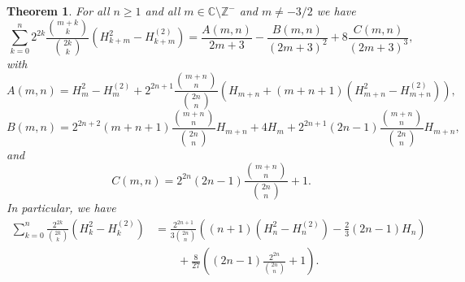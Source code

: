 \documentclass[11pt,reqno]{amsart}
\theoremstyle{plain}
\numberwithin{equation}{section}
\newtheorem{theorem}[thm]{Theorem}
\begin{document}
\begin{theorem}
For all $n\geq 1$ and all $m\in\mathbb C\setminus\mathbb Z^{-}$ and $m\neq -3/2$ we have
\begin{equation}\label{eq_har_final}
\sum_{k=0}^n 2^{2k} \frac{\binom{m+k}{k}}{\binom{2k}{k}}\left ( H_{k+m}^2 - H_{k+m}^{(2)}\right ) 
= \frac{A(m,n)}{2m+3} - \frac{B(m,n)}{(2m+3)^2} + 8 \frac{C(m,n)}{(2m+3)^3},
\end{equation}
with
\begin{equation}
A(m,n) = H_m^2-H_m^{(2)} + 2^{2n+1} \frac{\binom{m+n}{n}}{\binom{2n}{n}} \left ( H_{m+n}+(m+n+1)\left (H_{m+n}^2-H_{m+n}^{(2)}\right )\right ),
\end{equation}
\begin{equation}
B(m,n) = 2^{2n+2} (m+n+1) \frac{\binom{m+n}{n}}{\binom{2n}{n}}H_{m+n} + 4H_m + 2^{2n+1}(2n-1) \frac{\binom{m+n}{n}}{\binom{2n}{n}} H_{m+n},
\end{equation}
and
\begin{equation}
C(m,n) = 2^{2n} (2n-1) \frac{\binom{m+n}{n}}{\binom{2n}{n}} + 1.
\end{equation}
In particular, we have
\begin{align}\label{eq_har_final}
\sum_{k=0}^n \frac{2^{2k}}{\binom{2k}{k}}\left ( H_{k}^2 - H_{k}^{(2)}\right ) 
&= \frac{2^{2n+1}}{3 \binom{2n}{n}}\left ((n+1)\left( H_{n}^2 - H_{n}^{(2)}\right ) -  \frac{2}{3} (2n-1) H_n \right ) \nonumber \\
&\qquad + \frac{8}{27}\left ((2n-1) \frac{2^{2n}}{\binom{2n}{n}} + 1 \right).
\end{align}
\end{theorem}
\end{document}
